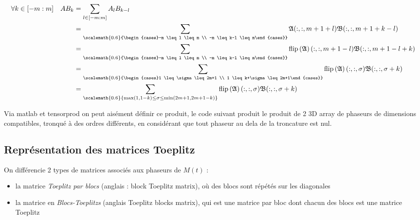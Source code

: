 \documentclass[journal,onecolumn]{IEEEtran}
\begin{document}
\begin{align}
\forall k \in [-m : m]\quad AB_{k} &= \sum_{l\in [-m: m]} A_{l} B_{k-l} \\
									&= \sum_{\scalemath{0.6}{\begin{cases}-m \leq l \leq m \\ -m \leq k-l \leq m\end{cases}}} \mathfrak{A}(:,:,m+1+l) \mathfrak{B}(:,:,m+1+k-l)\\
									&= \sum_{\scalemath{0.6}{\begin{cases}-m \leq l \leq m \\ -m \leq k-l \leq m\end{cases}}} \mathrm{flip}\left(\mathfrak{A}\right)(:,:,m+1-l) \mathfrak{B}(:,:,m+1-l+k)\\
									&= \sum_{\scalemath{0.6}{\begin{cases}1 \leq \sigma \leq 2m+1 \\ 1 \leq k+\sigma \leq 2m+1\end{cases}}} \mathrm{flip}\left(\mathfrak{A}\right)(:,:,\sigma) \mathfrak{B}(:,:,\sigma+k)\\
									&= \sum_{\scalemath{0.6}{\max (1,1-k) \leq \sigma \leq \min (2m+1,2m+1-k) }} \mathrm{flip}\left(\mathfrak{A}\right)(:,:,\sigma) \mathfrak{B}(:,:,\sigma+k)
\end{align}

Via matlab et tensorprod on peut aisément définir ce produit, le code suivant produit le produit de 2 3D array de phaseurs de dimensions compatibles, tronqué à des ordres différents, en considérant que tout phaseur au dela de la troncature est nul. 




\subsection{Représentation des matrices Toeplitz}

On différencie 2 types de matrices associés aux phaseurs de $M(t)$ : 
\begin{itemize}
\item la matrice \emph{Toeplitz par blocs} (anglais : block Toeplitz matrix), où des blocs sont répétés sur les diagonales
\item la matrice en \emph{Blocs-Toeplitzs} (anglais Toeplitz blocks matrix), qui est une matrice par bloc dont chacun des blocs est une matrice Toeplitz
\end{itemize}
\end{document}
